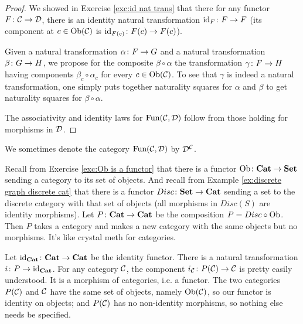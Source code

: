 \documentclass[CT4S-EN-RU]{subfiles}
\begin{document}
\begin{proof}

We showed in Exercise \ref{exc:id nat trans} that there for any functor $F\colon\mathcal{C}\rightarrow\mathcal{D}$, there is an identity natural transformation $\textnormal{id}_F\colon F\rightarrow F$ (its component at $c\in\textnormal{Ob}(\mathcal{C})$ is $\textnormal{id}_{F(c)}\colon F(c)\rightarrow F(c)$). 

Given a natural transformation $\alpha\colon F\rightarrow G$ and a natural transformation $\beta\colon G\rightarrow H$, we propose for the composite $\beta\circ\alpha$ the transformation $\gamma\colon F\rightarrow H$ having components $\beta_c\circ\alpha_c$ for every $c\in\textnormal{Ob}(\mathcal{C})$. To see that $\gamma$ is indeed a natural transformation, one simply puts together naturality squares for $\alpha$ and $\beta$ to get naturality squares for $\beta\circ\alpha$. 

The associativity and identity laws for $\textnormal{Fun}(\mathcal{C},\mathcal{D})$ follow from those holding for morphisms in $\mathcal{D}$.

\end{proof}

\begin{notation}
We sometimes denote the category $\textnormal{Fun}(\mathcal{C},\mathcal{D})$ by $\mathcal{D}^\mathcal{C}$. 
\end{notation}

\begin{example}

Recall from Exercise \ref{exc:Ob is a functor} that there is a functor $\textnormal{Ob}\colon{\bf Cat}\rightarrow{\bf Set}$ sending a category to its set of objects. And recall from Example \ref{ex:discrete graph discrete cat} that there is a functor $Disc\colon{\bf Set}\rightarrow{\bf Cat}$ sending a set to the discrete category with that set of objects (all morphisms in $Disc(S)$ are identity morphisms). Let $P\colon{\bf Cat}\rightarrow{\bf Cat}$ be the composition $P=Disc\circ\textnormal{Ob}$. Then $P$ takes a category and makes a new category with the same objects but no morphisms. It's like crystal meth for categories.

Let $\textnormal{id}_{\bf Cat}\colon{\bf Cat}\rightarrow{\bf Cat}$ be the identity functor. There is a natural transformation $i\colon P\rightarrow\textnormal{id}_{\bf Cat}$. For any category $\mathcal{C}$, the component $i_\mathcal{C}\colon P(\mathcal{C})\rightarrow\mathcal{C}$ is pretty easily understood. It is a morphism of categories, i.e. a functor. The two categories $P(\mathcal{C})$ and $\mathcal{C}$ have the same set of objects, namely $\textnormal{Ob}(\mathcal{C})$, so our functor is identity on objects; and $P(\mathcal{C})$ has no non-identity morphisms, so nothing else needs be specified.

\end{example}
\end{document}

